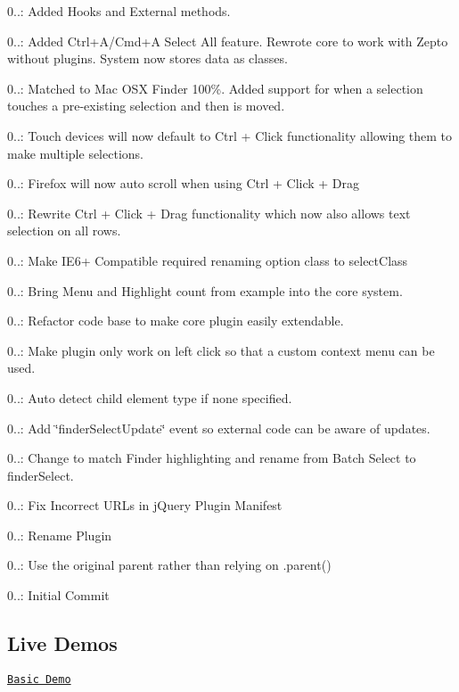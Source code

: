 \begin{DoxyItemize}
\item 0..\+: Added Hooks and External methods.
\item 0..\+: Added Ctrl+\+A/\+Cmd+\+A Select All feature. Rewrote core to work with Zepto without plugins. System now stores data as classes.
\item 0..\+: Matched to Mac O\+S\+X Finder 100\%. Added support for when a selection touches a pre-\/existing selection and then is moved.
\item 0..\+: Touch devices will now default to Ctrl + Click functionality allowing them to make multiple selections.
\item 0..\+: Firefox will now auto scroll when using Ctrl + Click + Drag
\item 0..\+: Rewrite Ctrl + Click + Drag functionality which now also allows text selection on all rows.
\item 0..\+: Make I\+E6+ Compatible required renaming option \textquotesingle{}class\textquotesingle{} to \textquotesingle{}select\+Class\textquotesingle{}
\item 0..\+: Bring Menu and Highlight count from example into the core system.
\item 0..\+: Refactor code base to make core plugin easily extendable.
\item 0..\+: Make plugin only work on left click so that a custom context menu can be used.
\item 0..\+: Auto detect child element type if none specified.
\item 0..\+: Add \char`\"{}finder\+Select\+Update\char`\"{} event so external code can be aware of updates.
\item 0..\+: Change to match Finder highlighting and rename from Batch Select to finder\+Select.
\item 0..\+: Fix Incorrect U\+R\+L\textquotesingle{}s in j\+Query Plugin Manifest
\item 0..\+: Rename Plugin
\item 0..\+: Use the original parent rather than relying on .parent()
\item 0..\+: Initial Commit
\end{DoxyItemize}

\subsection*{Live Demos}


\begin{DoxyItemize}
\item \href{http://evulse.github.io/finderSelect}{\tt Basic Demo} 
\end{DoxyItemize}